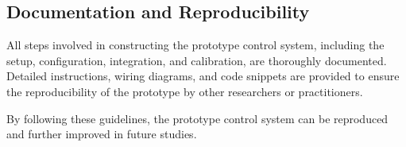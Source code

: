     \subsection{Documentation and Reproducibility}

    All steps involved in constructing the prototype control system, including the setup, configuration, integration, and calibration, are thoroughly documented. Detailed instructions, wiring diagrams, and code snippets are provided to ensure the reproducibility of the prototype by other researchers or practitioners.

    By following these guidelines, the prototype control system can be reproduced and further improved in future studies.